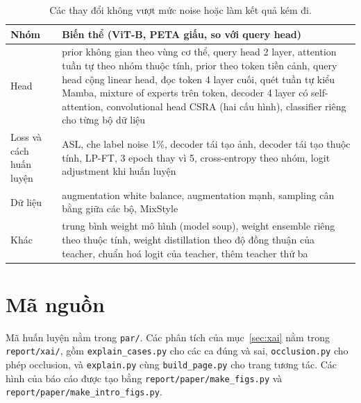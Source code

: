 \documentclass[11pt,a4paper]{article}
\begin{document}
\begin{table}[H]
\centering\small
\begin{tabularx}{\linewidth}{@{}lX@{}}
\toprule
Nhóm & Biến thể (ViT-B, PETA giấu, so với query head) \\
\midrule
Head & prior không gian theo vùng cơ thể, query head 2 layer, attention tuần tự theo nhóm thuộc tính, prior theo token tiền cảnh, query head cộng linear head, đọc token 4 layer cuối, quét tuần tự kiểu Mamba, mixture of experts trên token, decoder 4 layer có self-attention, convolutional head CSRA (hai cấu hình), classifier riêng cho từng bộ dữ liệu \\
Loss và cách huấn luyện & ASL, che label noise 1\%, decoder tái tạo ảnh, decoder tái tạo thuộc tính, LP-FT, 3 epoch thay vì 5, cross-entropy theo nhóm, logit adjustment khi huấn luyện \\
Dữ liệu & augmentation white balance, augmentation mạnh, sampling cân bằng giữa các bộ, MixStyle \\
Khác & trung bình weight mô hình (model soup), weight ensemble riêng theo thuộc tính, weight distillation theo độ đồng thuận của teacher, chuẩn hoá logit của teacher, thêm teacher thứ ba \\
\bottomrule
\end{tabularx}
\caption{Các thay đổi không vượt mức noise hoặc làm kết quả kém đi.}
\end{table}

\section{Mã nguồn}

{\sloppy Mã huấn luyện nằm trong \texttt{par/}. Các phân tích của mục~\ref{sec:xai} nằm trong \texttt{report/xai/}, gồm \texttt{explain\_cases.py} cho các ca đúng và sai, \texttt{occlusion.py} cho phép occlusion, và \texttt{explain.py} cùng \texttt{build\_page.py} cho trang tương tác. Các hình của báo cáo được tạo bằng \texttt{report/paper/make\_figs.py} và \texttt{report/paper/make\_intro\_figs.py}.\par}
\end{document}
